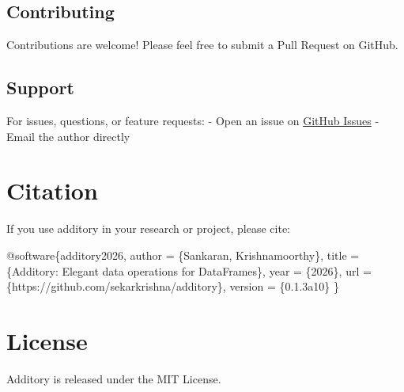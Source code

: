 \documentclass[
  letterpaper,
]{scrbook}
\newenvironment{Shaded}{\begin{snugshade}}{\end{snugshade}}
\newcommand{\CommentTok}[1]{\textcolor[rgb]{0.37,0.37,0.37}{#1}}
\begin{document}
\subsection*{Contributing}\label{contributing}

Contributions are welcome! Please feel free to submit a Pull Request on
GitHub.

\subsection*{Support}\label{support}

For issues, questions, or feature requests: - Open an issue on
\href{https://github.com/sekarkrishna/additory/issues}{GitHub Issues} -
Email the author directly

\section*{Citation}\label{citation}


If you use additory in your research or project, please cite:

\begin{Shaded}
\begin{Highlighting}[]
\CommentTok{@software\{additory2026,}
\CommentTok{  author = \{Sankaran, Krishnamoorthy\},}
\CommentTok{  title = \{Additory: Elegant data operations for DataFrames\},}
\CommentTok{  year = \{2026\},}
\CommentTok{  url = \{https://github.com/sekarkrishna/additory\},}
\CommentTok{  version = \{0.1.3a10\}}
\CommentTok{\}}
\end{Highlighting}
\end{Shaded}

\section*{License}\label{license-1}


Additory is released under the MIT License.
\end{document}
